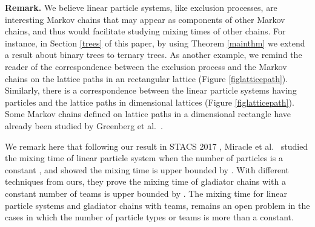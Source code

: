\documentclass[10 pt]{article}
\begin{document}
\textbf{Remark.} We believe linear particle systems, like exclusion processes, are interesting Markov chains that may appear as components
of other Markov chains, and thus would facilitate studying mixing times of other chains. For instance, in Section \ref{trees} of this paper,
by using Theorem \ref{mainthm} we extend a result about binary trees to ternary trees.  As another example, we remind the reader of the
correspondence between the exclusion process and the Markov chains on the lattice paths in an  rectangular lattice
(Figure \ref{figlatticepath}). Similarly, there is a correspondence between the linear particle systems having  particles and the lattice
paths in dimensional lattices (Figure \ref{figlatticepath}). Some Markov chains defined on lattice paths in a dimensional rectangle
have already been studied by Greenberg et al.\ \cite{Greenberg}.

\smallskip

We remark here that following our result in STACS 2017 \cite{Stacs}, Miracle et al.\ \cite{SaraAmanda} studied the mixing time of
linear particle system when the number of particles is a constant , and showed the mixing time is upper bounded by .
With different techniques from ours, they  prove the mixing time of gladiator chains with a constant number of teams is upper bounded
by . The mixing time for linear particle systems and gladiator chains with teams, remains an open problem in the cases
in which the number of particle types or teams is more than a constant. 
\end{document}
